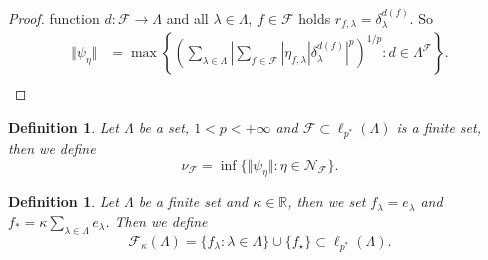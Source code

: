 \documentclass[12pt]{article}
\newtheorem{definition}[theorem]{Definition}
\begin{document}
\begin{proof}
    function $d:\mathcal{F}\to\Lambda$ and 
    all $\lambda\in\Lambda$, $f\in\mathcal{F}$ 
    holds $r_{f,\lambda}=\delta_{\lambda}^{d(f)}$. So 
    \[
    \begin{aligned}
        \Vert\psi_{\eta}\Vert
        &=\max\left\{
            \left(\sum_{\lambda\in\Lambda}
                \left|
                    \sum_{f\in\mathcal{F}}
                        |\eta_{f,\lambda}| \delta_{\lambda}^{d(f)}
                \right|^p
            \right)^{1/p}:
            d\in\Lambda^\mathcal{F}
        \right\}. \\
    \end{aligned}
    \]
\end{proof}

\begin{definition}\label{ExtMorphsNormInf}
    Let $\Lambda$ be a set, $1<p<+\infty$ 
    and $\mathcal{F}\subset\ell_{p^*}(\Lambda)$ is a finite set, then we define
    \[
        \nu_{\mathcal{F}}=\inf\{
            \Vert\psi_{\eta}\Vert : \eta\in\mathcal{N}_{\mathcal{F}}
        \}.
    \]
\end{definition}

\begin{definition}\label{SpclFuncFam}
    Let $\Lambda$ be a finite set and $\kappa\in\mathbb{R}$, then we set
    $f_\lambda=e_\lambda$ and $f_*=\kappa\sum_{\lambda\in\Lambda} e_\lambda$. 
    Then we define
    \[
        \mathcal{F}_{\kappa}(\Lambda)
        =\{f_\lambda: \lambda\in\Lambda\}
        \cup
        \{f_\star\}
        \subset \ell_{p^*}(\Lambda).
    \]
\end{definition}
\end{document}
